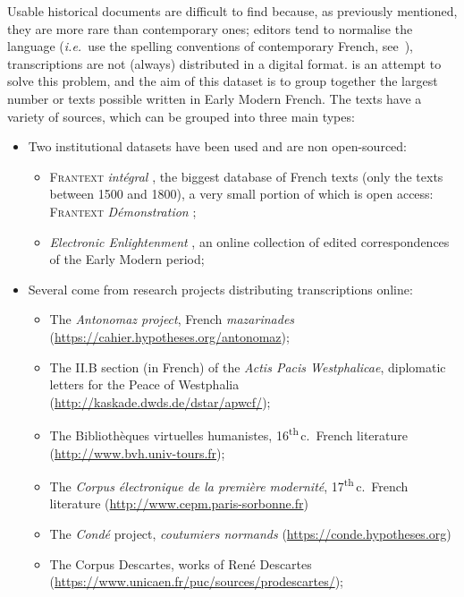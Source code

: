 Usable historical documents are difficult to find because, as previously mentioned, they are more rare than contemporary ones; editors tend to normalise the language (\textit{i.e.}~use the spelling conventions of contemporary French, see~\cite{gabay_pourquoi_2014}), transcriptions are not (always) distributed in a digital format. \freemmax \citep{FREEMmax} is an attempt to solve this problem, and the aim of this dataset is to group together the largest number or texts possible written in Early Modern French.
%
The texts have a variety of sources, which can be grouped into three main types:
\begin{itemize}
    \item Two institutional datasets have been used and are non open-sourced:
          \begin{itemize}
              \item \textsc{Frantext} \textit{intégral} \citep{atilf_frantext_1998}, the biggest database of French texts (only the texts between 1500 and 1800), a very small portion of which is open access: \textsc{Frantext} \textit{Démonstration} \citep{atilf_frantext_1998-1};
              \item \textit{Electronic Enlightenment} \citep{bodleian_libraries_electronic_2008}, an online collection of edited correspondences of the Early Modern period;
          \end{itemize}
    \item Several come from research projects distributing transcriptions online:
          \begin{itemize}
              \item The \textit{Antonomaz project},  French \textit{mazarinades} (\url{https://cahier.hypotheses.org/antonomaz});
              \item The II.B section (in French) of the \textit{Actis Pacis Westphalicae}, diplomatic letters for the Peace of Westphalia (\url{http://kaskade.dwds.de/dstar/apwcf/});
              \item The Bibliothèques virtuelles humanistes, 16\textsuperscript{th}\,c.~French literature (\url{http://www.bvh.univ-tours.fr});
              \item The \textit{Corpus électronique de la première modernité}, 17\textsuperscript{th}\,c.~French literature (\url{http://www.cepm.paris-sorbonne.fr})
              \item The \textit{Condé} project, \textit{coutumiers normands} (\url{https://conde.hypotheses.org})
              \item The Corpus Descartes, works of René Descartes (\url{https://www.unicaen.fr/puc/sources/prodescartes/});

\end{itemize}
\end{itemize}
